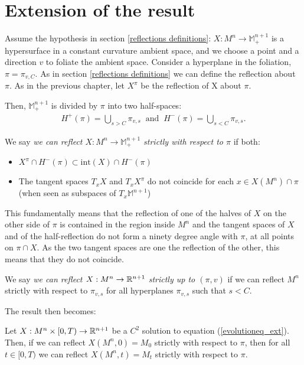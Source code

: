 \section{Extension of the result}	


Assume the hypothesis in section \ref{reflections definitions}: $X:M^n\rightarrow \mathbb{M}^{n+1}_+$ is a hypersurface in a constant curvature ambient space, and we choose a point and a direction $v$ to foliate the ambient space. Consider a hyperplane in the foliation, $\pi=\pi_{v, C}$. As in section \ref{reflections definitions} we can define the reflection about $\pi$. As in the previous chapter, let $X^\pi$ be the reflection of X about $\pi$.

Then, $\mathbb{M}^{n+1}_+$ is divided by $\pi$ into two half-spaces:
\begin{align*}
	H^+(\pi)= \bigcup_{s>C} \pi_{v, s} \;\;\mathrm{and}\;\;	H^-(\pi)= \bigcup_{s<C} \pi_{v, s}.
\end{align*} 

\begin{defin}
	We say {\em we can reflect $X: M^n\rightarrow \mathbb{M}^{n+1}_+$ strictly with respect to $\pi$} if both:
	\begin{itemize}
		\item $X^\pi\cap H^-(\pi)\subset \mathrm{int}(X)\cap H^-(\pi)$ 
		\item The tangent spaces $T_xX$ and $T_xX^\pi$ do not coincide for each $x\in X(M^n) \cap \pi$ (when seen as subspaces of  $T_x\mathbb{M}^{n+1}$)
	\end{itemize} 
\end{defin}
This fundamentally means that the reflection of one of the halves of $X$ on the other side of $\pi$ is contained in the region inside $M^n$ and the tangent spaces of $X$ and of the half-reflection do not form a ninety degree angle with $\pi$, at all points on $\pi\cap X$. As the two tangent spaces are one the reflection of the other, this means that they do not coincide.   
\begin{defin}
	We say {\em we can reflect $X: M^n\rightarrow \mathbb{R}^{n+1}$ strictly up to $(\pi,v)$} if we can reflect $M^n$ strictly with respect to $\pi_{v, s}$ for all hyperplanes $\pi_{v, s}$ such that $s<C$.  
\end{defin}

The result then becomes:


\begin{theorem}\label{chow gulliver extended}
	Let $X:M^n\times [0,T) \rightarrow \mathbb{R}^{n+1}$ be a $C^2$ solution to equation (\ref{evolutioneq_ext}). Then, if we can reflect $X(M^n, 0)=M_0$ strictly with respect to $\pi$, then for all $t\in [0,T)$ we can reflect $X(M^n, t)=M_t$ strictly with respect to $\pi$. 
\end{theorem}

